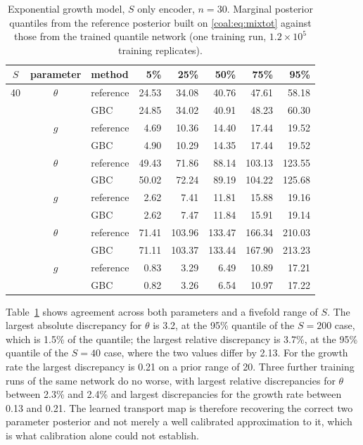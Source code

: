 \begin{table}[t]
\centering
\small
\setlength{\tabcolsep}{3pt}
\begin{tabular}{cclrrrrr}
\toprule
$S$ & parameter & method & 5\% & 25\% & 50\% & 75\% & 95\%\\
\midrule
40 & $\theta$ & reference & 24.53 & 34.08 & 40.76 & 47.61 & 58.18\\
   &          & GBC       & 24.85 & 34.02 & 40.91 & 48.23 & 60.30\\
   & $g$      & reference & 4.69 & 10.36 & 14.40 & 17.44 & 19.52\\
   &          & GBC       & 4.90 & 10.29 & 14.35 & 17.44 & 19.52\\
\addlinespace
100 & $\theta$ & reference & 49.43 & 71.86 & 88.14 & 103.13 & 123.55\\
    &          & GBC       & 50.02 & 72.24 & 89.19 & 104.22 & 125.68\\
    & $g$      & reference & 2.62 & 7.41 & 11.81 & 15.88 & 19.16\\
    &          & GBC       & 2.62 & 7.47 & 11.84 & 15.91 & 19.14\\
\addlinespace
200 & $\theta$ & reference & 71.41 & 103.96 & 133.47 & 166.34 & 210.03\\
    &          & GBC       & 71.11 & 103.37 & 133.44 & 167.90 & 213.23\\
    & $g$      & reference & 0.83 & 3.29 & 6.49 & 10.89 & 17.21\\
    &          & GBC       & 0.82 & 3.26 & 6.54 & 10.97 & 17.22\\
\bottomrule
\end{tabular}
\caption{Exponential growth model, $S$ only encoder, $n=30$. Marginal posterior quantiles from the reference posterior built on \eqref{coal:eq:mixtot} against those from the trained quantile network (one training run, $1.2\times10^5$ training replicates).}
\label{coal:tab:reference}
\end{table}

Table~\ref{coal:tab:reference} shows agreement across both parameters and a fivefold range of $S$. The largest absolute discrepancy for $\theta$ is 3.2, at the 95\% quantile of the $S=200$ case, which is 1.5\% of the quantile; the largest relative discrepancy is 3.7\%, at the 95\% quantile of the $S=40$ case, where the two values differ by 2.13. For the growth rate the largest discrepancy is 0.21 on a prior range of 20. Three further training runs of the same network do no worse, with largest relative discrepancies for $\theta$ between 2.3\% and 2.4\% and largest discrepancies for the growth rate between 0.13 and 0.21. The learned transport map is therefore recovering the correct two parameter posterior and not merely a well calibrated approximation to it, which is what calibration alone could not establish.

